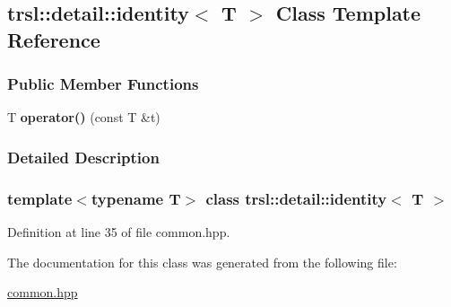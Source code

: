 \hypertarget{classtrsl_1_1detail_1_1identity}{
\subsection{trsl::detail::identity$<$ T $>$ Class Template Reference}
\label{classtrsl_1_1detail_1_1identity}
}
\subsubsection*{Public Member Functions}
\begin{DoxyCompactItemize}
\item 
\hypertarget{classtrsl_1_1detail_1_1identity_a09201c7d62aadc35847bc1537eaed659}{
T {\bfseries operator()} (const T \&t)}
\label{classtrsl_1_1detail_1_1identity_a09201c7d62aadc35847bc1537eaed659}

\end{DoxyCompactItemize}


\subsubsection{Detailed Description}
\subsubsection*{template$<$typename T$>$ class trsl::detail::identity$<$ T $>$}



Definition at line 35 of file common.hpp.

The documentation for this class was generated from the following file:\begin{DoxyCompactItemize}
\item 
\hyperlink{common_8hpp}{common.hpp}\end{DoxyCompactItemize}
